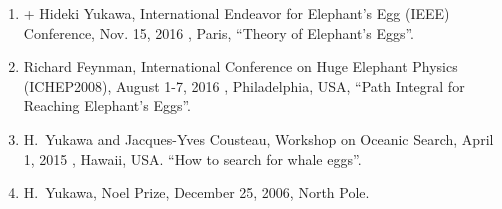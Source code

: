 \TalksInstructions	%
	\begin{enumerate}
		\item + Hideki Yukawa, 
            		International Endeavor for Elephant's Egg (IEEE) Conference, 
            			Nov. 15, 2016 , Paris,
            		 ``Theory of Elephant's Eggs''.

		\item Richard Feynman, 
            		International Conference on Huge Elephant Physics (ICHEP2008),
            		   August 1-7, 2016 , Philadelphia, USA,
            		 ``Path Integral for Reaching Elephant's Eggs''.

		\item H.~Yukawa and Jacques-Yves Cousteau, 
            		Workshop on Oceanic Search,
            		April 1, 2015 , Hawaii, USA.
            		 ``How to search for whale eggs''.

		\item H.~Yukawa, 
            		Noel Prize, December 25, 2006, North Pole.
	\end{enumerate}



